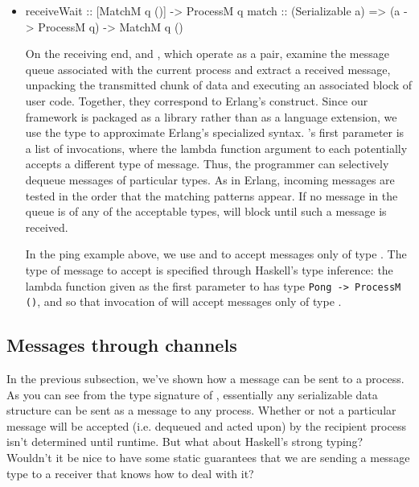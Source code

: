 \documentclass[preprint]{sigplanconf}
\begin{document}
\begin{itemize}
\item 
\begin{code}
receiveWait :: [MatchM q ()] -> ProcessM q
match :: (Serializable a) => (a -> ProcessM q) -> MatchM q ()
\end{code}

On the receiving end,  and , which operate as a pair, examine the message queue associated with the current process and extract a received message, unpacking the transmitted chunk of data and executing an associated block of user code. Together, they correspond to Erlang's  construct. Since our framework is packaged as a library rather than as a language extension, we use the  type to approximate Erlang's specialized syntax. 's first parameter is a list of  invocations, where the lambda function argument to each  potentially accepts a different type of message. Thus, the programmer can selectively dequeue messages of particular types. As in Erlang, incoming messages are tested in the order that the matching patterns appear. If no message in the queue is of any of the acceptable types,  will block until such a message is received. %

In the ping example above, we use  and  to accept messages only of type . The type of message to accept is specified through Haskell's type inference: the lambda function given as the first parameter to  has type \lstinline!Pong -> ProcessM ()!, and so that invocation of  will accept messages only of type .
\end{itemize}

\subsection{Messages through channels}
In the previous subsection, we've shown how a message can be sent to a process. As you can see from the type signature of , essentially any serializable data structure can be sent as a message to any process. Whether or not a particular message will be accepted (i.e. dequeued and acted upon) by the recipient process isn't determined until runtime. But what about Haskell's strong typing? Wouldn't it be nice to have some static guarantees that we are sending a message type to a receiver that knows how to deal with it?
\end{document}
